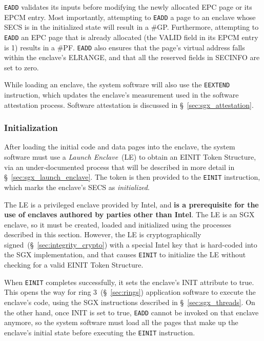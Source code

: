 \texttt{EADD} validates its inputs before modifying the newly allocated EPC
page or its EPCM entry. Most importantly, attempting to \texttt{EADD} a page to
an enclave whose SECS is in the initialized state will result in a \#GP.
Furthermore, attempting to \texttt{EADD} an EPC page that is already allocated
(the VALID field in its EPCM entry is 1) results in a \#PF. \texttt{EADD} also
ensures that the page's virtual address falls within the enclave's ELRANGE, and
that all the reserved fields in SECINFO are set to zero.

While loading an enclave, the system software will also use the
\texttt{EEXTEND} instruction, which updates the enclave's measurement used in
the software attestation process. Software attestation is discussed in
\S~\ref{sec:sgx_attestation}.


\subsubsection{Initialization}
\label{sec:sgx_einit_overview}


After loading the initial code and data pages into the enclave, the system
software must use a \textit{Launch Enclave}~(LE) to obtain an EINIT Token
Structure, via an under-documented process that will be described in more
detail in \S~\ref{sec:sgx_launch_enclave}. The token is then provided to the
\texttt{EINIT} instruction, which marks the enclave's SECS as
\textit{initialized}.

The LE is a privileged enclave provided by Intel, and \textbf{is a prerequisite
for the use of enclaves authored by parties other than Intel}. The LE is an
SGX enclave, so it must be created, loaded and initialized using the processes
described in this section. However, the LE is cryptographically
signed~(\S~\ref{sec:integrity_crypto}) with a special Intel key that is
hard-coded into the SGX implementation, and that causes \texttt{EINIT} to
initialize the LE  without checking for a valid EINIT Token Structure.

When \texttt{EINIT} completes successfully, it sets the enclave's INIT
attribute to true. This opens the way for ring 3~(\S~\ref{sec:rings})
application software to execute the enclave's code, using the SGX instructions
described in \S~\ref{sec:sgx_threads}. On the other hand, once INIT is set to
true, \texttt{EADD} cannot be invoked on that enclave anymore, so the system
software must load all the pages that make up the enclave's initial state
before executing the \texttt{EINIT} instruction.


